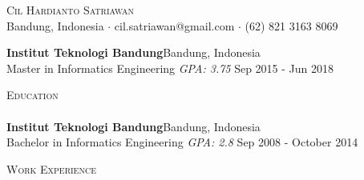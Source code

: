 \documentclass[a4paper]{article}
\newcommand{\lineunder} {
    \vspace*{-8pt} \\
    \hspace*{-18pt} \hrulefill \\
}
\newcommand{\header} [1] {
    {\hspace*{-18pt}\vspace*{6pt} \textsc{#1}}
    \vspace*{-6pt} \lineunder
}
\begin{document}
\vspace*{-40pt}

    

\vspace*{-10pt}
\begin{center}
	{\Huge \scshape {Cil Hardianto Satriawan}}\\
	Bandung, Indonesia $\cdot$ cil.satriawan@gmail.com $\cdot$ (62) 821 3163 8069\\
\end{center}

\textbf{Institut Teknologi Bandung}\hfill Bandung, Indonesia\\
Master in Informatics Engineering \textit{GPA: 3.75} \hfill Sep 2015 - Jun 2018\\
\vspace{2mm}
\header{Education}
\textbf{Institut Teknologi Bandung}\hfill Bandung, Indonesia\\
Bachelor in Informatics Engineering \textit{GPA: 2.8} \hfill Sep 2008 - October 2014\\
\vspace{2mm}

\header{Work Experience}
\vspace{1mm}
\end{document}
